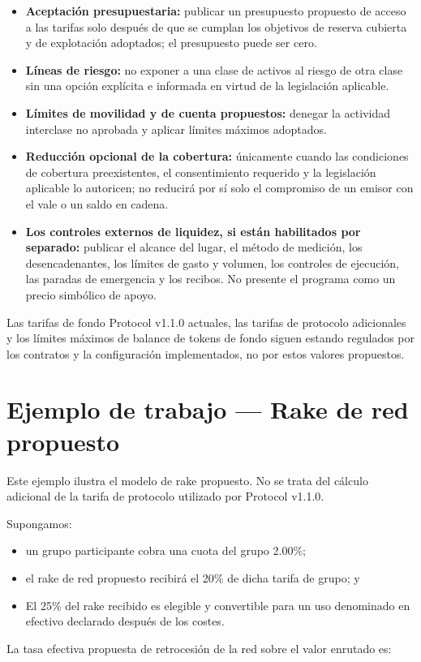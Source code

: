 \documentclass[11pt]{article}
\begin{document}
\begin{itemize}[leftmargin=*]
\item \textbf{Aceptación presupuestaria:} publicar un presupuesto propuesto de acceso a las tarifas solo después de que se cumplan los objetivos de reserva cubierta y de explotación adoptados; el presupuesto puede ser cero.
\item \textbf{Líneas de riesgo:} no exponer a una clase de activos al riesgo de otra clase sin una opción explícita e informada en virtud de la legislación aplicable.
\item \textbf{Límites de movilidad y de cuenta propuestos:} denegar la actividad interclase no aprobada y aplicar límites máximos adoptados.
\item \textbf{Reducción opcional de la cobertura:} únicamente cuando las condiciones de cobertura preexistentes, el consentimiento requerido y la legislación aplicable lo autoricen; no reducirá por sí solo el compromiso de un emisor con el vale o un saldo en cadena.
\item \textbf{Los controles externos de liquidez, si están habilitados por separado:} publicar el alcance del lugar, el método de medición, los desencadenantes, los límites de gasto y volumen, los controles de ejecución, las paradas de emergencia y los recibos. No presente el programa como un precio simbólico de apoyo.
\end{itemize}
Las tarifas de fondo Protocol v1.1.0 actuales, las tarifas de protocolo adicionales y los límites máximos de balance de tokens de fondo siguen estando regulados por los contratos y la configuración implementados, no por estos valores propuestos.


\section*{Ejemplo de trabajo --- Rake de red propuesto}

Este ejemplo ilustra el modelo de rake propuesto. No se trata del cálculo adicional de la tarifa de protocolo utilizado por Protocol v1.1.0.

Supongamos:

\begin{itemize}[leftmargin=*]
\item un grupo participante cobra una cuota del grupo 2.00\%;
\item el rake de red propuesto recibirá el 20\% de dicha tarifa de grupo; y
\item El 25\% del rake recibido es elegible y convertible para un uso denominado en efectivo declarado después de los costes.
\end{itemize}
La tasa efectiva propuesta de retrocesión de la red sobre el valor enrutado es:
\end{document}
